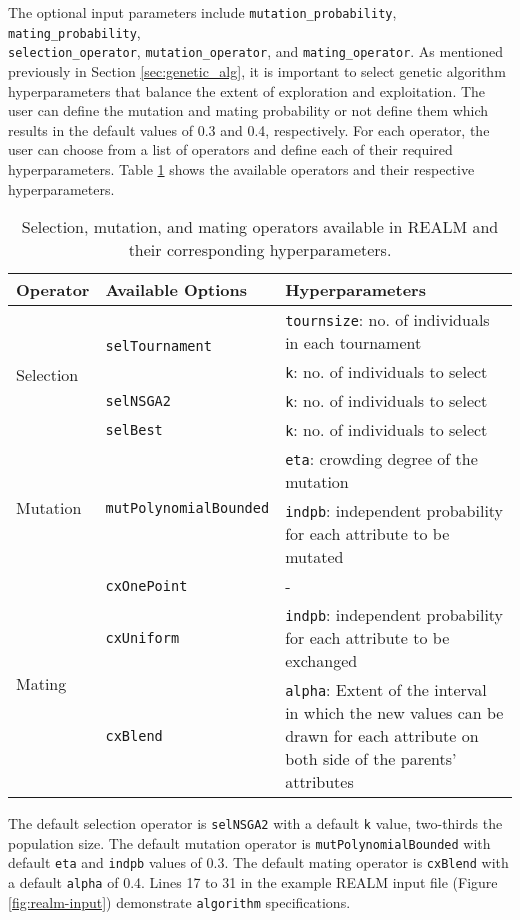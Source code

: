 The optional input parameters include \texttt{mutation\_probability}, 
\texttt{mating\_probability}, \\ \texttt{selection\_operator}, 
\texttt{mutation\_operator}, and \texttt{mating\_operator}. 
As mentioned previously in Section \ref{sec:genetic_alg}, it is important to 
select genetic algorithm hyperparameters that balance the extent of exploration 
and exploitation.
The user can define the mutation and mating probability or not define them which 
results in the default values of 0.3 and 0.4, respectively. 
For each operator, the user can choose from a list of operators and define each
of their required hyperparameters. 
Table \ref{tab:deap_operators} shows the available operators and their respective 
hyperparameters. 
\begin{table}[]
    \centering
    \onehalfspacing
    \caption{Selection, mutation, and mating operators available in 
    \acrfull{REALM} and their corresponding hyperparameters. }
	\label{tab:deap_operators}
    \footnotesize
    \begin{tabular}{l|p{}|p{}}
    \hline
    \textbf{Operator} & \textbf{Available Options} & \textbf{Hyperparameters} \\ \hline
    \multirow{4}{1cm}{Selection} & \multirow{2}{2cm}{\texttt{selTournament}} & \texttt{tournsize}: no. of individuals in each tournament\\ 
    & & \texttt{k}: no. of individuals to select \\ \cline{2-3}
    & \texttt{selNSGA2} & \texttt{k}: no. of individuals to select\\ \cline{2-3}
    & \texttt{selBest} & \texttt{k}: no. of individuals to select\\ \hline
    \multirow{2}{1cm}{Mutation} & \multirow{2}{2cm}{\texttt{mutPolynomialBounded}} & \texttt{eta}: crowding degree of the mutation\\  
    && \texttt{indpb}: independent probability for each attribute to be mutated\\ \hline
    \multirow{3}{1cm}{Mating} & \texttt{cxOnePoint} & -\\ \cline{2-3}
    & \texttt{cxUniform} & \texttt{indpb}: independent probability for each attribute to be exchanged\\ \cline{2-3}
    & \texttt{cxBlend} & \texttt{alpha}: Extent of the interval in which the new values can be drawn for each attribute on both side of the parents’ attributes\\ \hline
    \end{tabular}
    \end{table}
The default selection operator is \texttt{selNSGA2} with a default
\texttt{k} value, two-thirds the population size. 
The default mutation operator is \texttt{mutPolynomialBounded} with default
\texttt{eta} and \texttt{indpb} values of 0.3. 
The default mating operator is \texttt{cxBlend} with a default \texttt{alpha} 
of 0.4. 
Lines 17 to 31 in the example REALM input file (Figure \ref{fig:realm-input}) 
demonstrate \texttt{algorithm} specifications. 

